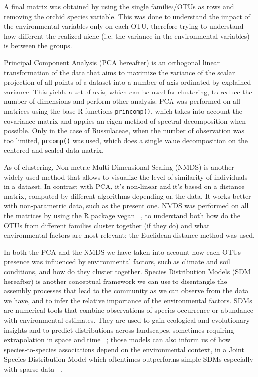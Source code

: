 A final matrix was obtained by using the single families\slash OTUs as rows and removing the orchid species variable. This was done to understand the impact of the environmental variables only on each OTU, therefore trying to understand how different the realized niche (i.e. the variance in the environmental variables) is between the groups.

Principal Component Analysis (PCA hereafter) is an orthogonal linear transformation of the data that aims to maximize the variance of the scalar projection of all points of a dataset into a number of axis ordinated by explained variance. This yields a set of axis, which can be used for clustering, to reduce the number of dimensions and perform other analysis. PCA was performed on all matrices using the base R functions \texttt{princomp()}, which takes into account the covariance matrix and applies an eigen method of spectral decomposition when possible. Only in the case of Russulaceae, when the number of observation was too limited, \texttt{prcomp()} was used, which does a single value decomposition on the centered and scaled data matrix.

As of clustering, Non-metric Multi Dimensional Scaling (NMDS) is another widely used method that allows to visualize the level of similarity of individuals in a dataset. In contrast with PCA, it's non-linear and it's based on a distance matrix, computed by different algorithms depending on the data. It works better with non-parametric data, such as the present one. NMDS was performed on all the matrices by using the R package vegan ~\citep{dixon2003a}, to understand both how do the OTUs from different families cluster together (if they do) and what environmental factors are most relevant; the Euclidean distance method was used.

In both the PCA and the NMDS we have taken into account how each OTUs presence was influenced by environmental factors, such as climate and soil conditions, and how do they cluster together.
Species Distribution Models (SDM hereafter) is another conceptual framework we can use to disentangle the assembly processes that lead to the community as we can observe from the data we have, and to infer the relative importance of the environmental factors. SDMs are numerical tools that combine observations of species occurrence or abundance with environmental estimates. They are used to gain ecological and evolutionary insights and to predict distributions across landscapes, sometimes requiring extrapolation in space and time ~\citep{elith2009}; those models can also inform us of how species‐to‐species associations depend on the environmental context, in a Joint Species Distribution Model which oftentimes outperforms simple SDMs especially with sparse data ~\citep{pollock2014, tikhonov2017}.

